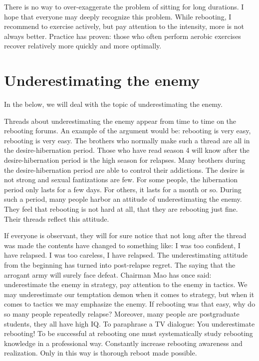 \documentclass[
]{book}
\begin{document}
There is no way to over-exaggerate the problem of sitting for long durations. I hope that everyone may deeply recognize this problem. While rebooting, I recommend to exercise actively, but pay attention to the intensity, more is not always better. Practice has proven: those who often perform aerobic exercises recover relatively more quickly and more optimally.

\hypertarget{underestimating-the-enemy}{%
\section{Underestimating the enemy}\label{underestimating-the-enemy}}

In the below, we will deal with the topic of underestimating the enemy.

Threads about underestimating the enemy appear from time to time on the rebooting forums. An example of the argument would be: rebooting is very easy, rebooting is very easy. The brothers who normally make such a thread are all in the desire-hibernation period. Those who have read season 4 will know after the desire-hibernation period is the high season for relapses. Many brothers during the desire-hibernation period are able to control their addictions. The desire is not strong and sexual fantizations are few. For some people, the hibernation period only lasts for a few days. For others, it lasts for a month or so. During such a period, many people harbor an attitude of underestimating the enemy. They feel that rebooting is not hard at all, that they are rebooting just fine. Their threads reflect this attitude.

If everyone is observant, they will for sure notice that not long after the thread was made the contents have changed to something like: I was too confident, I have relapsed. I was too careless, I have relapsed. The underestimating attitude from the beginning has turned into post-relapse regret. The saying that the arrogant army will surely face defeat. Chairman Mao has once said: underestimate the enemy in strategy, pay attention to the enemy in tactics. We may underestimate our temptation demon when it comes to strategy, but when it comes to tactics we may emphasize the enemy. If rebooting was that easy, why do so many people repeatedly relapse? Moreover, many people are postgraduate students, they all have high IQ. To paraphrase a TV dialogue: You underestimate rebooting! To be successful at rebooting one must systematically study rebooting knowledge in a professional way. Constantly increase rebooting awareness and realization. Only in this way is thorough reboot made possible.
\end{document}
